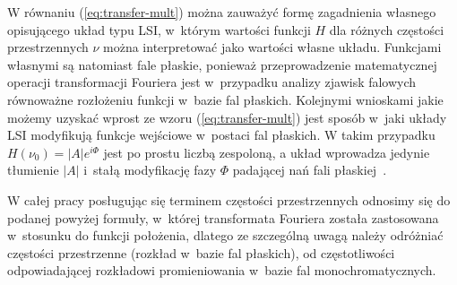 W równaniu (\ref{eq:transfer-mult}) można zauważyć formę zagadnienia własnego opisującego układ typu LSI, w~którym wartości funkcji $H$ dla różnych częstości przestrzennych $\nu$ można interpretować jako wartości własne układu. Funkcjami własnymi są natomiast fale płaskie, ponieważ przeprowadzenie matematycznej operacji transformacji Fouriera jest w~przypadku analizy zjawisk falowych równoważne rozłożeniu funkcji w~bazie fal płaskich.  Kolejnymi wnioskami jakie możemy uzyskać wprost ze wzoru (\ref{eq:transfer-mult}) jest sposób w~jaki układy LSI modyfikują funkcje wejściowe w~postaci fal płaskich. W takim przypadku $H(\nu_0)=|A|e^{i \Phi}$ jest po prostu liczbą zespoloną, a układ wprowadza jedynie tłumienie $|A|$ i~stałą modyfikację fazy $\Phi$ padającej nań fali płaskiej~\cite{citeulike:2926459}.

W całej pracy posługując się terminem częstości przestrzennych odnosimy się do podanej powyżej formuły, w~której transformata Fouriera została zastosowana w~stosunku do funkcji położenia, dlatego ze szczególną uwagą należy odróżniać częstości przestrzenne (rozkład w~bazie fal płaskich), od częstotliwości odpowiadającej rozkładowi promieniowania w~bazie fal monochromatycznych.

